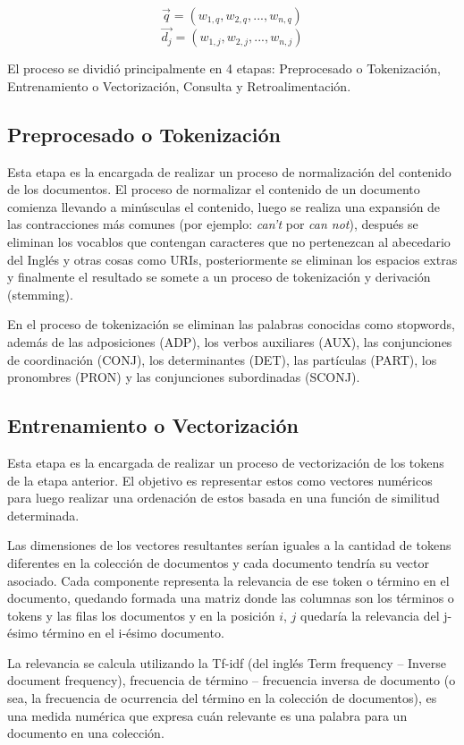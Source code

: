\documentclass[runningheads,a4paper]{llncs}
\begin{document}
$$ \vec{q} = (w_{1,q}, w_{2,q}, ..., w_{n,q}) $$ 
$$ \vec{d_j} = (w_{1,j}, w_{2,j}, ..., w_{n,j}) $$

El proceso se dividió principalmente en 4 etapas: Preprocesado o Tokenización, Entrenamiento o Vectorización, Consulta y  Retroalimentación.

\subsection{Preprocesado o Tokenización}

Esta etapa es la encargada de realizar un proceso de normalización del contenido de los documentos. El proceso de normalizar el contenido de un documento comienza llevando a minúsculas el contenido, luego se realiza una expansión de las contracciones más comunes (por ejemplo: \textit{can't} por \textit{can not}), después se eliminan los vocablos que contengan caracteres que no pertenezcan al abecedario del Inglés y otras cosas como URIs, posteriormente se eliminan los espacios extras y finalmente el resultado se somete a un proceso de tokenización y derivación (stemming).

En el proceso de tokenización se eliminan las palabras conocidas como stopwords, además de las adposiciones (ADP), los verbos auxiliares (AUX), las conjunciones de coordinación (CONJ), los determinantes (DET), las partículas (PART), los pronombres (PRON) y las conjunciones subordinadas (SCONJ).

\subsection{Entrenamiento o Vectorización}

Esta etapa es la encargada de realizar un proceso de vectorización de los tokens de la etapa anterior. El objetivo es representar estos como vectores numéricos para luego realizar una ordenación de estos basada en una función de similitud determinada.

Las dimensiones de los vectores resultantes serían iguales a la cantidad de tokens diferentes en la colección de documentos y cada documento tendría su vector asociado. Cada componente representa la relevancia de ese token o término en el documento, quedando formada una matriz donde las columnas son los términos o tokens y las filas los documentos y en la posición $i$, $j$ quedaría la relevancia del j-ésimo término en el i-ésimo documento.

La relevancia se calcula utilizando la Tf-idf (del inglés Term frequency – Inverse document frequency), frecuencia de término – frecuencia inversa de documento (o sea, la frecuencia de ocurrencia del término en la colección de documentos), es una medida numérica que expresa cuán relevante es una palabra para un documento en una colección.
\end{document}

